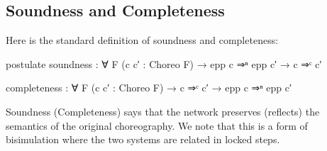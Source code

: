 \subsection{Soundness and Completeness}

Here is the standard definition of soundness and completeness:
%
\begin{center}\begin{code}
postulate
  soundness : ∀ {F} (c c′ : Choreo F) →
    epp c ⇒ⁿ epp c′ → c ⇒ᶜ c′

  completeness : ∀ {F} (c c′ : Choreo F) →
    c ⇒ᶜ c′ → epp c ⇒ⁿ epp c′
\end{code}\end{center}
%
Soundness (Completeness) says that the network preserves (reflects) the semantics of the original choreography.
%
We note that this is a form of bisimulation where the two systems are related in locked steps.
